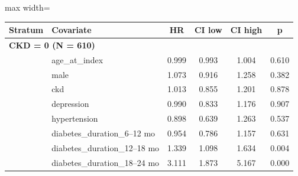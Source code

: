 \documentclass[twoside,11pt]{article}
\begin{document}
\begin{table}[H]
  \centering
  \begin{adjustbox}{max width=\textwidth}
    \begin{tabular}{llcccc}
      \hline
      \textbf{Stratum} & \textbf{Covariate}            & \textbf{HR} & \textbf{CI low} & \textbf{CI high} & \textbf{p}                  \\
      \hline

      \multicolumn{6}{l}{\textbf{CKD = 0 (N = 610)}}                                                                                    \\
                       & age\_at\_index                & 0.999       & 0.993           & 1.004            & 0.610                       \\
                       & male                          & 1.073       & 0.916           & 1.258            & 0.382                       \\
                       & ckd                           & 1.013       & 0.855           & 1.201            & 0.878                       \\
                       & depression                    & 0.990       & 0.833           & 1.176            & 0.907                       \\
                       & hypertension                  & 0.898       & 0.639           & 1.263            & 0.537                       \\
                       & diabetes\_duration\_6--12 mo  & 0.954       & 0.786           & 1.157            & 0.631                       \\
                       & diabetes\_duration\_12--18 mo & 1.339       & 1.098           & 1.634            & \cellcolor{lightgreen}0.004 \\
                       & diabetes\_duration\_18--24 mo & 3.111       & 1.873           & 5.167            & \cellcolor{lightgreen}0.000 \\


\end{tabular}
\end{adjustbox}
\end{table}
\end{document}
